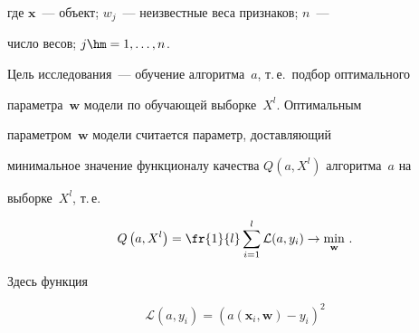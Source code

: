   \noindent


    где $\mathbf{x}$~--- объект; $w_j$~--- неизвестные веса признаков; $n$~--- 


число весов; $j\hm= 1, \ldots , n$. 





Цель исследования~--- обучение алгоритма~$a$, т.\,е.\ подбор оптимального 


параметра~$\mathbf{w}$ модели по обучающей выборке~$X^l$. Оптимальным 


параметром~$\mathbf{w}$ модели считается параметр, доставляющий 


минимальное значение функционалу качества $Q(a, X^l)$ алгоритма~$a$ на 


выборке~$X^l$, т.\,е.\





\noindent


\begin{equation}


Q\left( a, X^l\right) =\fr{1}{l}\sum\limits^l_{i=1} \mathcal{L}(a,y_i)\to 


\min\limits_{\mathbf{w}}\,.


\label{e2-bob}


\end{equation}





  \vspace*{-2pt}


  


  \noindent


Здесь функция





\noindent


\begin{equation}


\mathcal{L}(a,y_i) =\left( a(\mathbf{x}_i, \mathbf{w})-y_i\right)^2


\label{e3-bob}


\end{equation}





  \vspace*{-2pt}


  


  \noindent


